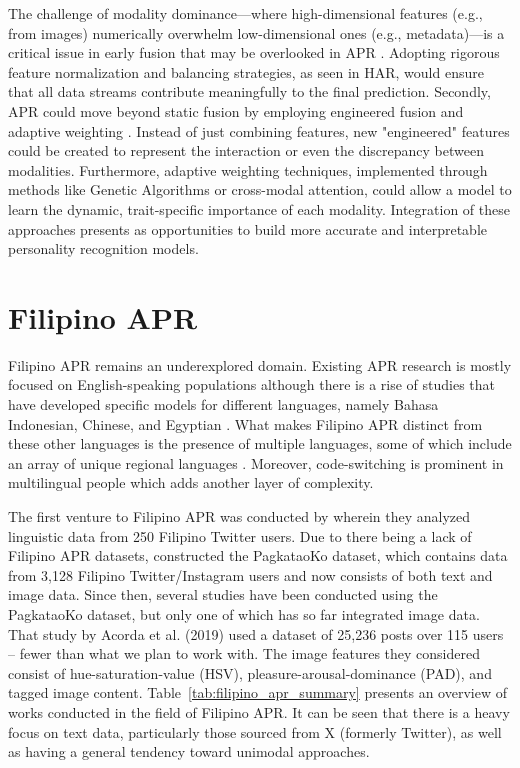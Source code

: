 The challenge of modality dominance—where high-dimensional features (e.g., from images) numerically overwhelm low-dimensional ones (e.g., metadata)—is a critical issue in early fusion that may be overlooked in APR \citep{Ehatisham-Ul-Haq_Javed_Azam_Malik_Irtaza_Lee_Mahmood_2019}. Adopting rigorous feature normalization and balancing strategies, as seen in HAR, would ensure that all data streams contribute meaningfully to the final prediction. Secondly, APR could move beyond static fusion by employing engineered fusion and adaptive weighting \citep{Cai_Qu_Li_Zhang_Hu_Hu_2020}. Instead of just combining features, new "engineered" features could be created to represent the interaction or even the discrepancy between modalities. Furthermore, adaptive weighting techniques, implemented through methods like Genetic Algorithms or cross-modal attention, could allow a model to learn the dynamic, trait-specific importance of each modality. Integration of these approaches presents as opportunities to build more accurate and interpretable personality recognition models.

\section{Filipino APR}
\label{sec: FilipinoAPR}
Filipino APR remains an underexplored domain. Existing APR research is mostly focused on English-speaking populations although there is a rise of studies that have developed specific models for different languages, namely Bahasa Indonesian, Chinese, and Egyptian \citep{Siddique2019, Salem2019, adi_optimization_2018}. What makes Filipino APR distinct from these other languages is the presence of multiple languages, some of which include an array of unique regional languages \citep{tighe_modeling_2018}. Moreover, code-switching is prominent in multilingual people which adds another layer of complexity.

The first venture to Filipino APR was conducted by \citet{tighe_modeling_2018} wherein they analyzed linguistic data from 250 Filipino Twitter users. Due to there being a lack of Filipino APR datasets, \citet{tighe_acorda_2022} constructed the PagkataoKo dataset, which contains data from 3,128 Filipino Twitter/Instagram users and now consists of both text and image data. Since then, several studies have been conducted using the PagkataoKo dataset, but only one of which has so far integrated image data. That study by Acorda et al. (2019) used a dataset of 25,236 posts over 115 users – fewer than what we plan to work with. The image features they considered consist of hue-saturation-value (HSV), pleasure-arousal-dominance (PAD), and tagged image content. Table~\ref{tab:filipino_apr_summary} presents an overview of works conducted in the field of Filipino APR. It can be seen that there is a heavy focus on text data, particularly those sourced from X (formerly Twitter), as well as having a general tendency toward unimodal approaches. 

